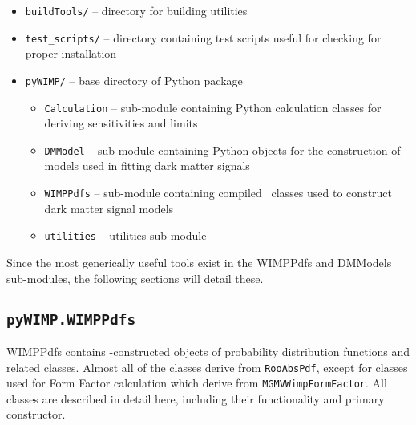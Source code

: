			\lstset{language=sh}
			\begin{itemize}
		  	  	\setlength{\itemsep}{0.5pt}
		  	  	\setlength{\parskip}{0pt}
		  	  	\setlength{\parsep}{0pt}
				\item[] \lstinline!buildTools/! -- directory for building utilities
				\item[] \lstinline!test_scripts/! -- directory containing test scripts useful for checking for proper installation
				\item[] \lstinline!pyWIMP/! -- base directory of Python package
				\begin{itemize}
		  	  		\setlength{\itemsep}{0.5pt}
		  	  		\setlength{\parskip}{0pt}
		  	  		\setlength{\parsep}{0pt}
					\item[] \lstinline!Calculation! -- sub-module containing Python calculation classes for deriving sensitivities and limits
					\item[] \lstinline!DMModel! -- sub-module containing Python objects for the construction of models used in fitting dark matter signals
					\item[] \lstinline!WIMPPdfs! -- sub-module containing compiled \cpp~classes used to construct dark matter signal models
					\item[] \lstinline!utilities! -- utilities sub-module
				\end{itemize}
			\end{itemize}
Since the most generically useful tools exist in the WIMPPdfs and DMModels sub-modules, the following sections will detail these.
			\lstset{language=Python}		
		\subsection{\texorpdfstring{\lstinline!pyWIMP.WIMPPdfs!}{pyWIMP.WIMPPdfs}}

WIMPPdfs contains \cpp-constructed objects of probability distribution functions and related classes.  Almost all of the classes derive from \lstinline!RooAbsPdf!, except for classes used for Form Factor calculation which derive from \lstinline!MGMVWimpFormFactor!.  All classes are described in detail here, including their functionality and primary constructor.  
